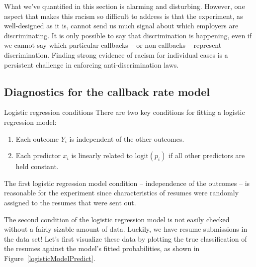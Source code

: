 What we've quantified in this section is alarming and disturbing.
However, one aspect that makes this racism so difficult to
address is that the experiment, as well-designed as it is,
cannot send us much signal about which employers are
discriminating.
It is only possible to say that discrimination is happening,
even if we cannot say which particular callbacks
-- or non-callbacks -- represent discrimination.
Finding strong evidence of racism for individual cases is
a persistent challenge in enforcing anti-discrimination laws.



\subsection{Diagnostics for the callback rate model}
\label{logistic_regr_diagnostics_subsection}

\begin{onebox}{Logistic regression conditions}
There are two key conditions for fitting a logistic regression model:\vspace{-1mm}
\begin{enumerate}
\setlength{\itemsep}{0mm}
\item
    Each outcome $Y_i$ is independent of the other outcomes.
\item
    Each predictor $x_i$ is linearly related to logit$(p_i)$
    if all other predictors are held constant.
\end{enumerate}
\end{onebox}

The first logistic regression model condition
-- independence of the outcomes --
is reasonable for the experiment since characteristics
of resumes were randomly assigned to the resumes that
were sent out.

The second condition of the logistic regression model is
not easily checked without a fairly sizable amount of data.
Luckily, we have \resN{} resume submissions in the data set!
Let's first visualize these data by plotting the true
classification of the resumes against the model's fitted
probabilities, as shown in
Figure~\ref{logisticModelPredict}.

